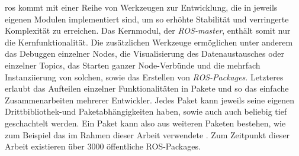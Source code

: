 \gls{ros} kommt mit einer Reihe von Werkzeugen zur Entwicklung, die in jeweils eigenen Modulen implementiert sind, um so erhöhte Stabilität und verringerte Komplexität zu erreichen. Das Kernmodul, der \textit{ROS-master}, enthält somit nur die Kernfunktionalität. Die zusätzlichen Werkzeuge ermöglichen unter anderem das Debuggen einzelner Nodes, die Visualisierung des Datenaustausches oder einzelner Topics, das Starten ganzer Node-Verbünde und die mehrfach Instanziierung von solchen, sowie das Erstellen von \textit{ROS-Packages}. Letzteres erlaubt das Aufteilen einzelner Funktionalitäten in Pakete und so das einfache Zusammenarbeiten mehrerer Entwickler. Jedes Paket kann jeweils seine eigenen Drittbibliothek-und Paketabhängigkeiten haben, sowie auch auch beliebig tief geschachtelt werden. Ein Paket kann also aus weiteren Paketen bestehen, wie zum Beispiel das im Rahmen dieser Arbeit verwendete \robosherlock [Verweis]. Zum Zeitpunkt dieser Arbeit existieren über 3000 öffentliche ROS-Packages.   

